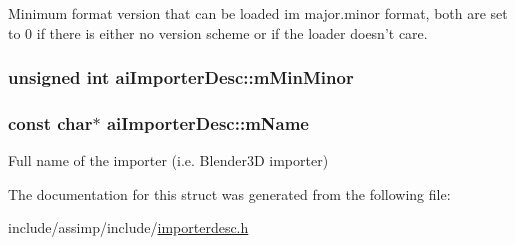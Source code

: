 Minimum format version that can be loaded im major.\-minor format, both are set to 0 if there is either no version scheme or if the loader doesn't care. \hypertarget{structai_importer_desc_adb265dee32c6533234c45638df66ddab}{
\subsubsection[{m\-Min\-Minor}]{\setlength{\rightskip}{0pt plus 5cm}unsigned {\bf int} ai\-Importer\-Desc\-::m\-Min\-Minor}}\label{structai_importer_desc_adb265dee32c6533234c45638df66ddab}
\hypertarget{structai_importer_desc_a2a9d5fd818c01bba1a0a782722ab9495}{
\subsubsection[{m\-Name}]{\setlength{\rightskip}{0pt plus 5cm}const char$\ast$ ai\-Importer\-Desc\-::m\-Name}}\label{structai_importer_desc_a2a9d5fd818c01bba1a0a782722ab9495}
Full name of the importer (i.\-e. Blender3\-D importer) 

The documentation for this struct was generated from the following file\-:\begin{DoxyCompactItemize}
\item 
include/assimp/include/\hyperlink{importerdesc_8h}{importerdesc.\-h}\end{DoxyCompactItemize}
